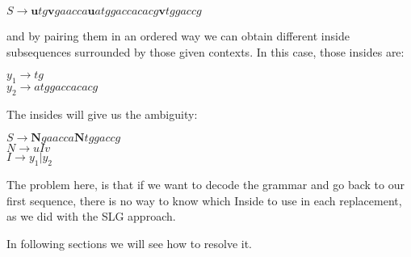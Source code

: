 	\begin{center}
	$S \rightarrow \textbf{u}tg\textbf{v}gaacca\textbf{u}atggaccacacg\textbf{v}tggaccg$
	\end{center}

	and by pairing them in an ordered way we can obtain different inside subsequences surrounded
	by those given contexts. In this case, those insides are: \\
	\begin{center}
	$y_1 \rightarrow tg$ \\
	$y_2 \rightarrow atggaccacacg$
	\end{center}

	The insides will give us the ambiguity: \\

	\begin{center}
	$S \rightarrow \textbf{N}gaacca\textbf{N}tggaccg$\\
	$N \rightarrow u I v$ \\
	$I \rightarrow y_1 | y_2$
	\end{center}

	The problem here, is that if we want to decode the grammar and go back to our
	first sequence, there is no way to know which Inside to use in each replacement, as
	we did with the SLG approach. 

	In following sections we will see how to resolve it.